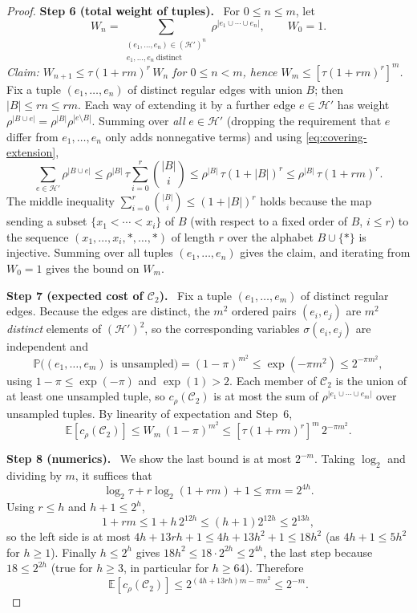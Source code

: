 \documentclass[11pt,letterpaper]{article}
\theoremstyle{definition}
\theoremstyle{remark}
\numberwithin{equation}{section}
\newcommand{\step}[1]{\par\medskip\noindent\textbf{#1}\ }
\begin{document}
\begin{proof}
\step{Step 6 (total weight of tuples).}
For \(0\le n\le m\), let
\[
W_n=
\sum_{\substack{(e_1,\ldots,e_n)\in(\mathcal H')^n\\
                e_1,\ldots,e_n\ \text{distinct}}}
  \rho^{|e_1\cup\cdots\cup e_n|},
\qquad W_0=1.
\]
\emph{Claim: $W_{n+1}\le \tau(1+rm)^r\,W_n$ for $0\le n<m$, hence
$W_m\le[\tau(1+rm)^r]^m$.}
Fix a tuple $(e_1,\ldots,e_n)$ of distinct regular edges with union $B$;
then $|B|\le rn\le rm$. Each way of extending it by a further edge
$e\in\mathcal H'$ has weight
$\rho^{|B\cup e|}=\rho^{|B|}\rho^{|e\setminus B|}$. Summing over
\emph{all} $e\in\mathcal H'$ (dropping the requirement that $e$ differ from
$e_1,\ldots,e_n$ only adds nonnegative terms) and using
\eqref{eq:covering-extension},
\[
\sum_{e\in\mathcal H'}\rho^{|B\cup e|}
\le\rho^{|B|}\,\tau\sum_{i=0}^r\binom{|B|}{i}
\le\rho^{|B|}\,\tau(1+|B|)^r
\le\rho^{|B|}\,\tau(1+rm)^r .
\]
The middle inequality $\sum_{i=0}^r\binom{|B|}{i}\le(1+|B|)^r$ holds
because the map sending a subset $\{x_1<\cdots<x_i\}$ of $B$ (with respect
to a fixed order of $B$, $i\le r$) to the sequence
$(x_1,\ldots,x_i,\ast,\ldots,\ast)$ of length $r$ over the alphabet
$B\cup\{\ast\}$ is injective. Summing over all tuples $(e_1,\ldots,e_n)$
gives the claim, and iterating from $W_0=1$ gives the bound on $W_m$.

\step{Step 7 (expected cost of $\mathcal C_2$).}
Fix a tuple $(e_1,\ldots,e_m)$ of distinct regular edges. Because the
edges are distinct, the $m^2$ ordered pairs $(e_i,e_j)$ are $m^2$
\emph{distinct} elements of $(\mathcal H')^2$, so the corresponding
variables $\sigma(e_i,e_j)$ are independent and
\[
\mathbb P\bigl((e_1,\ldots,e_m)\text{ is unsampled}\bigr)
=(1-\pi)^{m^2}\le\exp(-\pi m^2)\le2^{-\pi m^2},
\]
using $1-\pi\le\exp(-\pi)$ and $\exp(1)>2$. Each member of $\mathcal C_2$
is the union of at least one unsampled tuple, so $c_\rho(\mathcal C_2)$ is
at most the sum of $\rho^{|e_1\cup\cdots\cup e_m|}$ over unsampled tuples.
By linearity of expectation and Step~6,
\[
\mathbb E[c_\rho(\mathcal C_2)]
\le W_m\,(1-\pi)^{m^2}
\le[\tau(1+rm)^r]^m\,2^{-\pi m^2}.
\]

\step{Step 8 (numerics).}
We show the last bound is at most $2^{-m}$. Taking $\log_2$ and dividing by
$m$, it suffices that
\[
\log_2 \tau+r\log_2(1+rm)+1\le\pi m=2^{4h}.
\]
Using $r\le h$ and $h+1\le2^h$,
\[
1+rm\le1+h\,2^{12h}\le(h+1)2^{12h}\le2^{13h},
\]
so the left side is at most $4h+13rh+1\le4h+13h^2+1\le18h^2$ (as
$4h+1\le5h^2$ for $h\ge1$). Finally $h\le 2^h$ gives
$18h^2\le18\cdot2^{2h}\le2^{4h}$, the last step because $18\le2^{2h}$
(true for $h\ge3$, in particular for $h\ge64$). Therefore
\begin{equation}\label{eq:covering-residual-cost}
\mathbb E[c_\rho(\mathcal C_2)]
\le2^{(4h+13rh)m-\pi m^2}\le2^{-m}.
\end{equation}


\end{proof}
\end{document}
